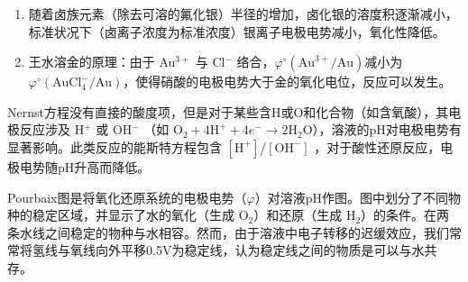 \begin{example}
  \begin{enumerate}
    \item 随着卤族元素（除去可溶的氟化银）半径的增加，卤化银的溶度积逐渐减小，标准状况下（卤离子浓度为标准浓度）银离子电极电势减小，氧化性降低。
    \item 王水溶金的原理：由于 Au$^{3+}$ 与 Cl$^-$ 络合，$\varphi^\circ(\text{Au}^{3+}/\text{Au}) $减小为$ \varphi^\circ(\text{AuCl}_4^-/\text{Au})$，使得硝酸的电极电势大于金的氧化电位，反应可以发生。
  \end{enumerate}
\end{example}

Nernst方程没有直接的酸度项，但是对于某些含H或O和化合物（如含氧酸），其电极反应涉及 H$^+$ 或 OH$^-$ （如 O$_2 + 4\text{H}^+ + 4e^- \to 2\text{H}_2\text{O}$），溶液的pH对电极电势有显著影响。此类反应的能斯特方程包含 $[\text{H}^+]$/$[\text{OH}^-]$ ，对于酸性还原反应，电极电势随pH升高而降低。


\begin{definition}
Pourbaix图是将氧化还原系统的电极电势（$\varphi$）对溶液pH作图。图中划分了不同物种的稳定区域，并显示了水的氧化（生成 O$_2$）和还原（生成 H$_2$）的条件。在两条水线之间稳定的物种与水相容。然而，由于溶液中电子转移的迟缓效应，我们常常将氢线与氧线向外平移0.5V为稳定线，认为稳定线之间的物质是可以与水共存。
\end{definition}

